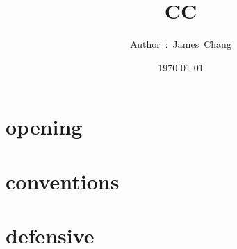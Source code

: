 

\title{CC}
\author{ {\Biohazard} \hspace{1.5mm} \hspace{1.5mm} Author\ :\ James\ Chang}
\date{\today}


\large

\tableofcontents

\chapter{opening}





\chapter{conventions}


\chapter{defensive}






